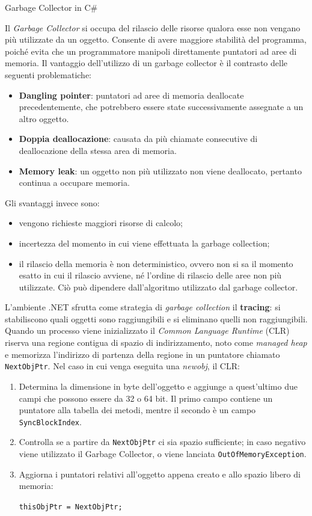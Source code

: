 \begin{problem}{1.5}
Garbage Collector in C\#
\end{problem}
\begin{solution}
Il \textit{Garbage Collector} si occupa del rilascio delle risorse qualora esse non vengano più utilizzate da un oggetto.
Consente di avere maggiore stabilità del programma, poiché evita che un programmatore manipoli direttamente puntatori ad aree di memoria.
\newline
Il vantaggio dell'utilizzo di un garbage collector è il contrasto delle seguenti problematiche:
\begin{itemize}
	\item \textbf{Dangling pointer}: puntatori ad aree di memoria deallocate precedentemente, che potrebbero essere state successivamente assegnate a un altro oggetto.
	\item \textbf{Doppia deallocazione}: causata da più chiamate consecutive di deallocazione della stessa area di memoria.
	\item \textbf{Memory leak}: un oggetto non più utilizzato non viene deallocato, pertanto continua a occupare memoria.
\end{itemize}
Gli svantaggi invece sono:
\begin{itemize}
	\item vengono richieste maggiori risorse di calcolo;
	\item incertezza del momento in cui viene effettuata la garbage collection;
	\item il rilascio della memoria è non deterministico, ovvero non si sa il momento esatto in cui il rilascio avviene, né l'ordine di rilascio delle aree non più utilizzate. Ciò può dipendere dall'algoritmo utilizzato dal garbage collector.
\end{itemize}
L'ambiente .NET sfrutta come strategia di \textit{garbage collection} il \textbf{tracing}: si stabiliscono quali oggetti sono raggiungibili e si eliminano quelli non raggiungibili.\newline
Quando un processo viene inizializzato il \textit{Common Language Runtime} (CLR) riserva una regione contigua di spazio di indirizzamento, noto come \textit{managed heap} e memorizza l'indirizzo di partenza della regione in un puntatore chiamato \texttt{NextObjPtr}.
Nel caso in cui venga eseguita una \textit{newobj}, il CLR:
\begin{enumerate}
	\item Determina la dimensione in byte dell'oggetto e aggiunge a quest'ultimo due campi che possono essere da 32 o 64 bit.
	Il primo campo contiene un puntatore alla tabella dei metodi, mentre il secondo è un campo \texttt{SyncBlockIndex}.
	\item Controlla se a partire da \texttt{NextObjPtr} ci sia spazio sufficiente; in caso negativo viene utilizzato il Garbage Collector, o viene lanciata \texttt{OutOfMemoryException}.
	\item Aggiorna i puntatori relativi all'oggetto appena creato e allo spazio libero di memoria:
	\begin{center}
		\texttt{thisObjPtr = NextObjPtr;}


\end{center}
\end{enumerate}
\end{solution}

